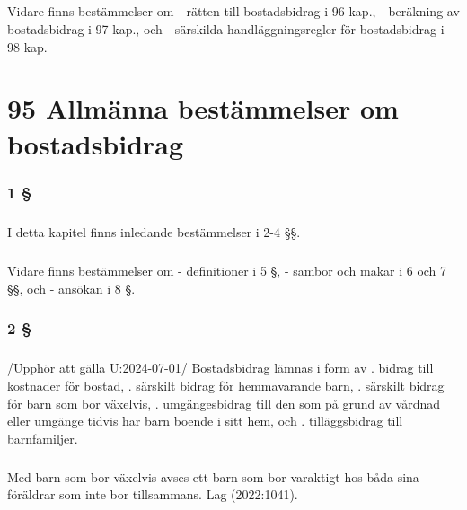 \documentclass[a4paper,notitlepage,openany,10pt]{book}
\begin{document}
\paragraph*{}
Vidare finns bestämmelser om
\newline - rätten till bostadsbidrag i 96 kap.,
\newline - beräkning av bostadsbidrag i 97 kap., och
\newline - särskilda handläggningsregler för bostadsbidrag i 98 kap.
\chapter*{95 Allmänna bestämmelser om bostadsbidrag}
\subsection*{1 §}
\paragraph*{}
I detta kapitel finns inledande bestämmelser i 2-4 §§.
\paragraph*{}
Vidare finns bestämmelser om
\newline - definitioner i 5 §,
\newline - sambor och makar i 6 och 7 §§, och
\newline - ansökan i 8 §.
\subsection*{2 §}
\paragraph*{}
/Upphör att gälla U:2024-07-01/
Bostadsbidrag lämnas i form av
. bidrag till kostnader för bostad,
. särskilt bidrag för hemmavarande barn,
. särskilt bidrag för barn som bor växelvis,
. umgängesbidrag till den som på grund av vårdnad eller umgänge tidvis har barn boende i sitt hem, och
. tilläggsbidrag till barnfamiljer.
\paragraph*{}
Med barn som bor växelvis avses ett barn som bor varaktigt hos båda sina föräldrar som inte bor tillsammans.
Lag (2022:1041).
\end{document}
